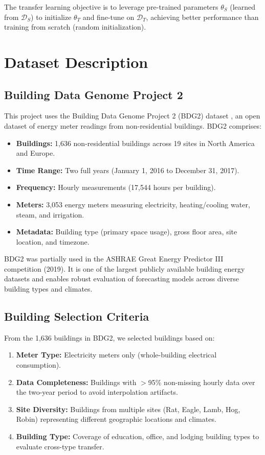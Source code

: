 \documentclass[12pt,a4paper]{report}
\begin{document}
The transfer learning objective is to leverage pre-trained parameters \(\theta_S\) (learned from \(\mathcal{D}_S\)) to initialize \(\theta_T\) and fine-tune on \(\mathcal{D}_T\), achieving better performance than training from scratch (random initialization).

\section{Dataset Description}

\subsection{Building Data Genome Project 2}

This project uses the Building Data Genome Project 2 (BDG2) dataset \cite{miller2020building}, an open dataset of energy meter readings from non-residential buildings. BDG2 comprises:

\begin{itemize}
    \item \textbf{Buildings:} 1,636 non-residential buildings across 19 sites in North America and Europe.
    \item \textbf{Time Range:} Two full years (January 1, 2016 to December 31, 2017).
    \item \textbf{Frequency:} Hourly measurements (17,544 hours per building).
    \item \textbf{Meters:} 3,053 energy meters measuring electricity, heating/cooling water, steam, and irrigation.
    \item \textbf{Metadata:} Building type (primary space usage), gross floor area, site location, and timezone.
\end{itemize}

BDG2 was partially used in the ASHRAE Great Energy Predictor III competition (2019). It is one of the largest publicly available building energy datasets and enables robust evaluation of forecasting models across diverse building types and climates.

\subsection{Building Selection Criteria}

From the 1,636 buildings in BDG2, we selected buildings based on:

\begin{enumerate}
    \item \textbf{Meter Type:} Electricity meters only (whole-building electrical consumption).
    \item \textbf{Data Completeness:} Buildings with $>$95\% non-missing hourly data over the two-year period to avoid interpolation artifacts.
    \item \textbf{Site Diversity:} Buildings from multiple sites (Rat, Eagle, Lamb, Hog, Robin) representing different geographic locations and climates.
    \item \textbf{Building Type:} Coverage of education, office, and lodging building types to evaluate cross-type transfer.
\end{enumerate}
\end{document}

